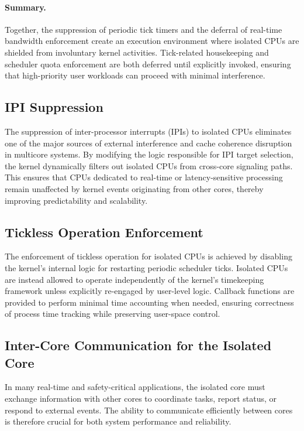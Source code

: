 \documentclass[letterpaper]{article}
\begin{document}
\paragraph{Summary.}
Together, the suppression of periodic tick timers and the deferral of real-time 
bandwidth enforcement create an execution environment where isolated CPUs are 
shielded from involuntary kernel activities. Tick-related housekeeping and 
scheduler quota enforcement are both deferred until explicitly invoked, ensuring 
that high-priority user workloads can proceed with minimal interference. 

\subsection{IPI Suppression}
The suppression of inter-processor interrupts (IPIs) to isolated CPUs eliminates one of the major
sources of external interference and cache coherence disruption in multicore systems. By
modifying the logic responsible for IPI target selection, the kernel dynamically filters out isolated
CPUs from cross-core signaling paths.
This ensures that CPUs dedicated to real-time or latency-sensitive processing remain unaffected
by kernel events originating from other cores, thereby improving predictability and scalability.


\subsection{Tickless Operation Enforcement}
The enforcement of tickless operation for isolated CPUs is achieved by disabling the kernel's
internal logic for restarting periodic scheduler ticks. Isolated CPUs are instead allowed to operate
independently of the kernel's timekeeping framework unless explicitly re-engaged by user-level
logic.
Callback functions are provided to perform minimal time accounting when needed, ensuring
correctness of process time tracking while preserving user-space control.


\subsection{Inter-Core Communication for the Isolated Core}

In many real-time and safety-critical applications, the isolated core must exchange information
with other cores to coordinate tasks, report status, or respond to external events. The ability
to communicate efficiently between cores is therefore crucial for both system performance and reliability. 
\end{document}
